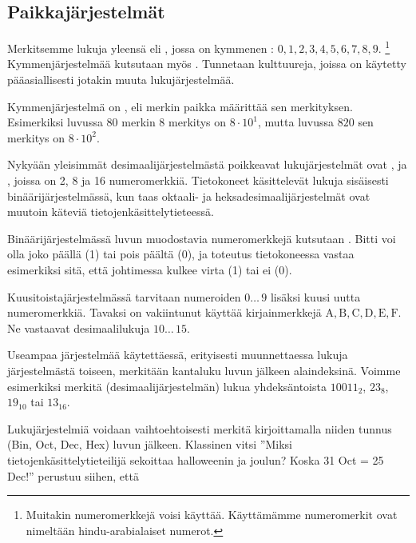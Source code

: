 \subsection*{Paikkajärjestelmät}

Merkitsemme lukuja yleensä  eli , jossa on kymmenen :
$0, 1, 2, 3, 4, 5, 6, 7, 8, 9$.
\footnote{Muitakin numeromerkkejä voisi käyttää. Käyttämämme numeromerkit ovat nimeltään hindu-arabialaiset numerot.}
Kymmenjärjestelmää kutsutaan myös .
Tunnetaan kulttuureja, joissa on käytetty pääasiallisesti jotakin muuta lukujärjestelmää.

Kymmenjärjestelmä on , eli merkin paikka määrittää sen merkityksen.
Esimerkiksi luvussa $80$ merkin 8 merkitys on $8 \cdot 10^1$, mutta luvussa $820$ sen merkitys on $8 \cdot 10^2$.

Nykyään yleisimmät desimaalijärjestelmästä poikkeavat lukujärjestelmät ovat ,
 ja , joissa on 2, 8 ja 16 numeromerkkiä.
Tietokoneet käsittelevät lukuja sisäisesti binäärijärjestelmässä, kun taas oktaali- ja heksadesimaalijärjestelmät ovat muutoin käteviä tietojenkäsittelytieteessä.

Binäärijärjestelmässä luvun muodostavia numeromerkkejä kutsutaan .
Bitti voi olla joko päällä (1) tai pois päältä (0), ja toteutus tietokoneessa vastaa esimerkiksi sitä, että johtimessa kulkee virta (1) tai ei (0).


Kuusitoistajärjestelmässä tarvitaan numeroiden $0 \ldots \, 9$ lisäksi kuusi uutta numeromerkkiä.
Tavaksi on vakiintunut käyttää kirjainmerkkejä $\mathrm{A, B, C, D, E, F}$. Ne vastaavat desimaalilukuja $10 \ldots \, 15$.

Useampaa järjestelmää käytettäessä, erityisesti muunnettaessa lukuja järjestelmästä toiseen, merkitään kantaluku luvun jälkeen alaindeksinä.
Voimme esimerkiksi merkitä (desimaalijärjestelmän) lukua yhdeksäntoista $10011_{2}$, $23_{8}$, $19_{10}$ tai $13_{16}$.

Lukujärjestelmiä voidaan vaihtoehtoisesti merkitä kirjoittamalla niiden tunnus (Bin, Oct, Dec, Hex) luvun jälkeen.
Klassinen vitsi ''Miksi tietojenkäsittelytieteilijä sekoittaa halloweenin ja joulun? Koska 31 Oct = 25 Dec!'' perustuu siihen, että

